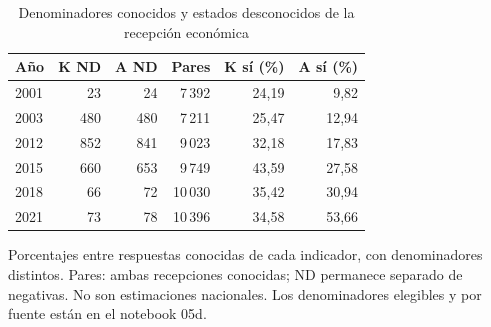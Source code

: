 \begin{table}[!htbp]
\centering
\caption{Denominadores conocidos y estados desconocidos de la recepción económica}\label{tab:proteccion-validez}
\small\setlength{\tabcolsep}{4pt}
\renewcommand{\arraystretch}{1.15}
\begin{tabular}{lrrrrr}
\toprule
\textbf{Año} & \textbf{K ND} & \textbf{A ND} & \textbf{Pares} & \textbf{K sí (\%)} & \textbf{A sí (\%)} \\
\midrule
2001 & 23 & 24 & 7\,392 & 24,19 & 9,82 \\
2003 & 480 & 480 & 7\,211 & 25,47 & 12,94 \\
2012 & 852 & 841 & 9\,023 & 32,18 & 17,83 \\
2015 & 660 & 653 & 9\,749 & 43,59 & 27,58 \\
2018 & 66 & 72 & 10\,030 & 35,42 & 30,94 \\
2021 & 73 & 78 & 10\,396 & 34,58 & 53,66 \\
\bottomrule
\end{tabular}
\par\medskip
\parbox{\linewidth}{\footnotesize Porcentajes entre respuestas conocidas de cada indicador, con denominadores distintos. Pares: ambas recepciones conocidas; ND permanece separado de negativas. No son estimaciones nacionales. Los denominadores elegibles y por fuente están en el notebook 05d.}
\end{table}
